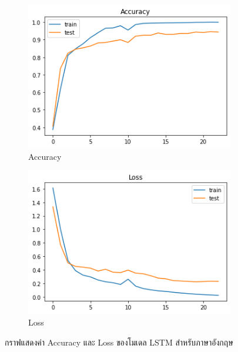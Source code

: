 \documentclass[12pt,oneside,openright,a4paper]{cpe-thai-project}
\begin{document}
      \begin{figure}[!ht]\centering
        \begin{subfigure}{0.49\textwidth}
          \includegraphics[width=\linewidth]{./img/lstm_eng_acc.png} 
          \caption{Accuracy}
          \label{fig:lstm_eng_acc}
        \end{subfigure}
        \begin{subfigure}{0.49\textwidth}
          \includegraphics[width=\linewidth]{./img/lstm_eng_loss.png}
          \caption{Loss}
          \label{fig:lstm_eng_loss}
        \end{subfigure}
        \caption{กราฟแสดงค่า Accuracy และ Loss ของโมเดล LSTM สำหรับภาษาอังกฤษ}
        \label{fig:lstm_eng}
      \end{figure}
\end{document}
